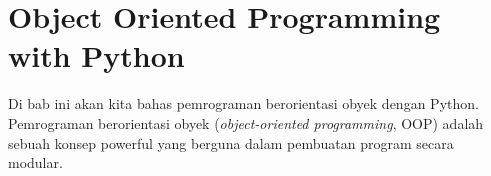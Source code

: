 
\chapter{Object Oriented Programming with Python}

Di bab ini akan kita bahas pemrograman berorientasi obyek dengan Python. Pemrograman berorientasi obyek (\emph{object-oriented programming}, OOP) adalah sebuah konsep powerful yang berguna dalam pembuatan program secara modular.


